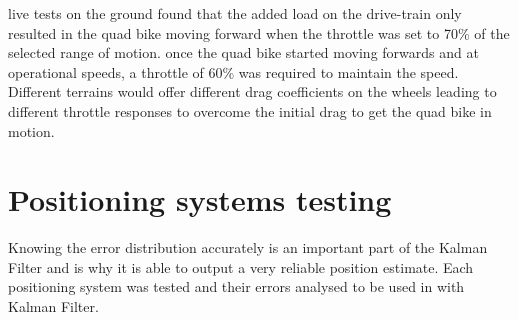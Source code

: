 \documentclass[main.tex]{subfiles}
\begin{document}
live tests on the ground found that the added load on the drive-train only resulted in the quad bike moving forward when the throttle was set to 70\% of the selected range of motion. once the quad bike started moving forwards and at operational speeds, a throttle of 60\% was required to maintain the speed. Different terrains would offer different drag coefficients on the wheels leading to different throttle responses to overcome the initial drag to get the quad bike in motion.

\section{Positioning systems testing}
Knowing the error distribution accurately is an important part of the Kalman Filter and is why it is able to output a very reliable position estimate. Each positioning system was tested and their errors analysed to be used in with Kalman Filter. 
\end{document}
